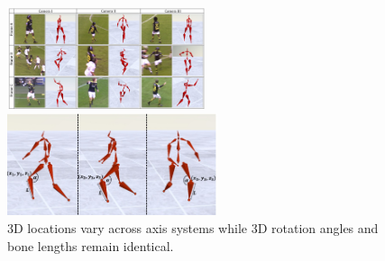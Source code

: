 \begin{figure}[t]
\setlength{\abovecaptionskip}{5pt plus 3pt minus 2pt}
\setlength{\belowcaptionskip}{-20pt plus 3pt minus 2pt}

\centering
\begin{minipage}[b]{0.52\linewidth}
    \centering
    \includegraphics[width=\textwidth,height=3cm]{./images/football_results.pdf}
    \caption{Results on the KTH Multi-view Football II dataset~\cite{footballDS}, in occluded and blurry scenes with dynamic cameras.
    }
    \label{fig:football_teaser}
\end{minipage}
\hfill
\begin{minipage}[b]{0.44\linewidth}
    \centering
    \includegraphics[width=\textwidth,height=3cm]{./images/Skeleton_angles.jpg}
    \caption{3D locations vary across axis systems while 3D rotation angles and bone lengths remain identical.
    }
    \label{fig:skeleton_angles}
\end{minipage}
\end{figure}
